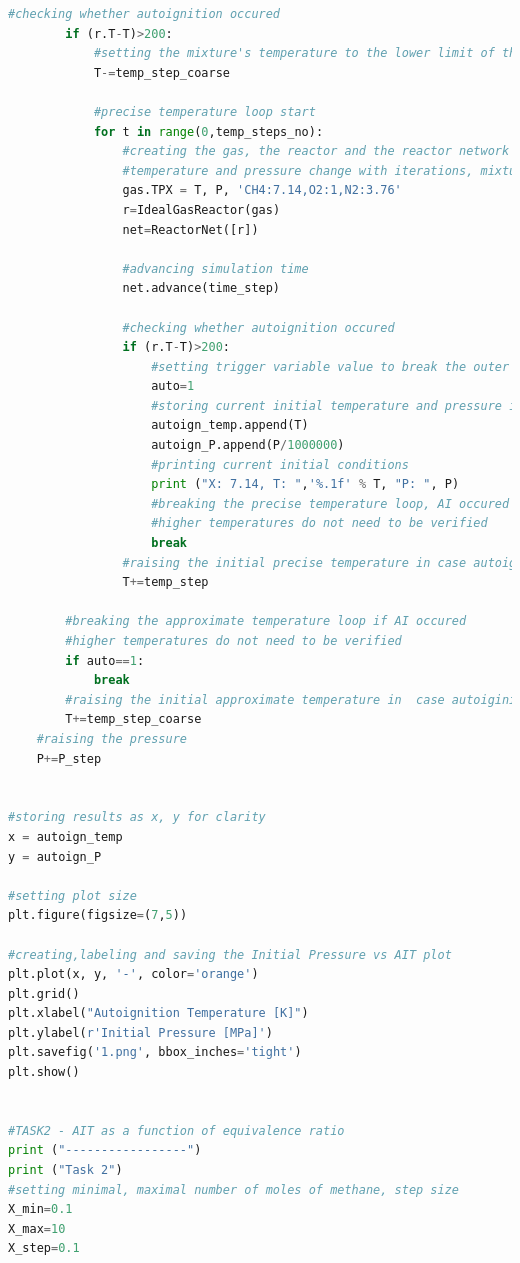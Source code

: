 \documentclass[a4paper,11pt]{article}
\begin{document}
\begin{lstlisting}[language=Python]
        #checking whether autoignition occured   
        if (r.T-T)>200:
            #setting the mixture's temperature to the lower limit of the approximate temperature window
            T-=temp_step_coarse
            
            #precise temperature loop start 
            for t in range(0,temp_steps_no):
                #creating the gas, the reactor and the reactor network for precise calculations
                #temperature and pressure change with iterations, mixture composition is constant
                gas.TPX = T, P, 'CH4:7.14,O2:1,N2:3.76'
                r=IdealGasReactor(gas)
                net=ReactorNet([r])
                
                #advancing simulation time 
                net.advance(time_step)
                
                #checking whether autoignition occured 
                if (r.T-T)>200:
                    #setting trigger variable value to break the outer loop 
                    auto=1
                    #storing current initial temperature and pressure in arrays
                    autoign_temp.append(T)
                    autoign_P.append(P/1000000)
                    #printing current initial conditions
                    print ("X: 7.14, T: ",'%.1f' % T, "P: ", P)
                    #breaking the precise temperature loop, AI occured
                    #higher temperatures do not need to be verified
                    break
                #raising the initial precise temperature in case autoiginition didn't occur    
                T+=temp_step 
                
        #breaking the approximate temperature loop if AI occured
        #higher temperatures do not need to be verified
        if auto==1:
            break    
        #raising the initial approximate temperature in  case autoiginition didn't occur    
        T+=temp_step_coarse
    #raising the pressure   
    P+=P_step


#storing results as x, y for clarity
x = autoign_temp
y = autoign_P
 
#setting plot size
plt.figure(figsize=(7,5))

#creating,labeling and saving the Initial Pressure vs AIT plot
plt.plot(x, y, '-', color='orange') 
plt.grid()
plt.xlabel("Autoignition Temperature [K]")
plt.ylabel(r'Initial Pressure [MPa]')
plt.savefig('1.png', bbox_inches='tight')
plt.show()


#TASK2 - AIT as a function of equivalence ratio
print ("-----------------")
print ("Task 2")
#setting minimal, maximal number of moles of methane, step size
X_min=0.1
X_max=10
X_step=0.1


\end{lstlisting}
\end{document}
